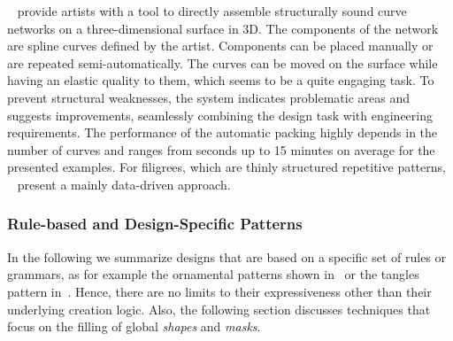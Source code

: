 \citeauthor*{zehnder_2016_dso}~\cite{zehnder_2016_dso} provide artists with a tool to directly assemble structurally sound curve networks on a three-dimensional surface in 3D. The components of the network are spline curves defined by the artist. Components can be placed manually or are repeated semi-automatically. The curves can be moved on the surface while having an elastic quality to them, which seems to be a quite engaging task. To prevent structural weaknesses, the system indicates problematic areas and suggests improvements, seamlessly combining the design task with engineering requirements. The performance of the automatic packing highly depends in the number of curves and ranges from seconds up to 15 minutes on average for the presented examples. For filigrees, which are thinly structured repetitive patterns, \citeauthor*{chen_2016_sof}~\cite{chen_2016_sof} present a mainly data-driven approach. 




\subsubsection{Rule-based and Design-Specific Patterns}
\label{subsubsec:analysis_rulebased_and_designspecific}

In the following we summarize designs that are based on a specific set of rules or grammars, as for example the ornamental patterns shown in~ or the tangles pattern in~. Hence, there are no limits to their expressiveness other than their underlying creation logic. Also, the following section discusses techniques that focus on the filling of global \textit{shapes} and \textit{masks}.

